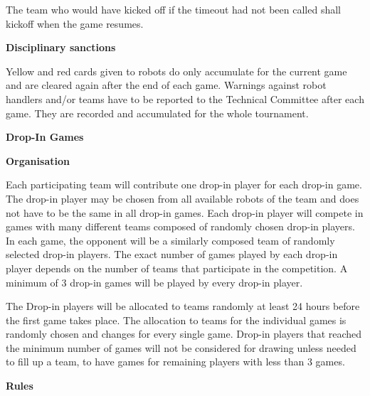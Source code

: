 The team who would have kicked off if the timeout had not been called shall kickoff when the game resumes.

\bigskip

{\bfseries Disciplinary sanctions}

Yellow and red cards given to robots do only accumulate for the current game and are cleared again after the end of each game. Warnings against robot handlers and/or teams have to be reported to the Technical Committee after each game. They are recorded and accumulated for the whole tournament. 




\bigskip

{\bfseries Drop-In Games}

\headlinebox

{\bfseries Organisation}

Each participating team will contribute one drop-in player for each drop-in game. The drop-in player may be chosen from all available robots of the team and does not have to be the same in all drop-in games. Each drop-in player will compete in games with many different teams composed of randomly chosen drop-in players. In each game, the opponent will  be a similarly composed team of randomly selected drop-in players. The exact number of games played by each drop-in player depends on the number of teams that participate in the competition. A minimum of 3 drop-in games will be played by every drop-in player.

\bigskip

The Drop-in players will be allocated to teams randomly at least 24 hours before the first game takes place. The allocation to teams for the individual games is randomly chosen and changes for every single game. Drop-in players that reached the minimum number of games will not be considered for drawing unless needed to fill up a team, to have games for remaining players with less than 3 games.


\bigskip

{\bfseries Rules}

